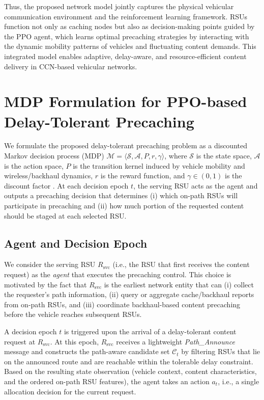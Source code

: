 Thus, the proposed network model jointly captures the physical vehicular communication environment and the reinforcement learning framework. RSUs function not only as caching nodes but also as decision-making points guided by the PPO agent, which learns optimal precaching strategies by interacting with the dynamic mobility patterns of vehicles and fluctuating content demands. This integrated model enables adaptive, delay-aware, and resource-efficient content delivery in CCN-based vehicular networks.  
















\section{MDP Formulation for PPO-based Delay-Tolerant Precaching}
\label{sec:MDPmodel}
We formulate the proposed delay-tolerant precaching problem as a discounted Markov decision process (MDP)
$\mathcal{M}=\langle\mathcal{S},\mathcal{A},P,r,\gamma\rangle$,
where $\mathcal{S}$ is the state space, $\mathcal{A}$ is the action space, $P$ is the transition kernel induced by vehicle mobility and wireless/backhaul dynamics, $r$ is the reward function, and $\gamma\in(0,1)$ is the discount factor \cite{MDP}. 
At each decision epoch $t$, the serving RSU acts as the agent and outputs a precaching decision that determines (i) which on-path RSUs will participate in precaching and (ii) how much portion of the requested content should be staged at each selected RSU. 

\subsection{Agent and Decision Epoch}
We consider the serving RSU $R_{\mathrm{svc}}$ (i.e., the RSU that first receives the content request) as the \emph{agent} that executes the precaching control. 
This choice is motivated by the fact that $R_{\mathrm{svc}}$ is the earliest network entity that can (i) collect the requester’s path information, (ii) query or aggregate cache/backhaul reports from on-path RSUs, and (iii) coordinate backhaul-based content precaching before the vehicle reaches subsequent RSUs.

A decision epoch $t$ is triggered upon the arrival of a delay-tolerant content request at $R_{\mathrm{svc}}$. 
At this epoch, $R_{\mathrm{svc}}$ receives a lightweight \textit{Path\_Announce} message and constructs the path-aware candidate set $\mathcal{C}_t$ by filtering RSUs that lie on the announced route and are reachable within the tolerable delay constraint. 
Based on the resulting state observation (vehicle context, content characteristics, and the ordered on-path RSU features), the agent takes an action $a_t$, i.e., a single allocation decision for the current request.

